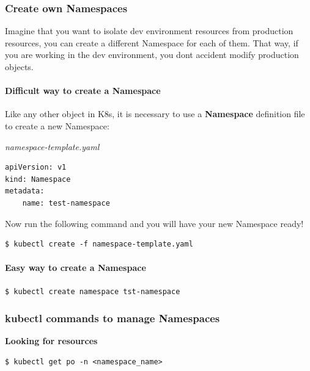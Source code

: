 \documentclass{article}
\newenvironment{codetemplate}[1][]{%
  \mybasecolorbox[#1]
  \itshape
}{%
  \endmybasecolorbox
}
\begin{document}
\subsubsection{Create own Namespaces}

Imagine that you want to isolate dev environment resources from production resources, you can create a different Namespace for each of them. That way, if you are working in the dev environment, you dont accident modify production objects.

\paragraph{Difficult way to create a Namespace}

Like any other object in K8s, it is necessary to use a \textbf{Namespace} definition file to create a new Namespace:

\begin{codetemplate}{namespace-template.yaml}
\begin{verbatim}
apiVersion: v1
kind: Namespace
metadata:
    name: test-namespace
\end{verbatim}
\end{codetemplate}

Now run the following command and you will have your new Namespace ready!

\begin{codetemplate}{}
\begin{verbatim}
$ kubectl create -f namespace-template.yaml
\end{verbatim}
\end{codetemplate}

\paragraph{Easy way to create a Namespace}

\begin{codetemplate}{}
\begin{verbatim}
$ kubectl create namespace tst-namespace
\end{verbatim}
\end{codetemplate}

\subsubsection{kubectl commands to manage Namespaces}

\textbf{Looking for resources}
\begin{codetemplate}{}
\begin{verbatim}
$ kubectl get po -n <namespace_name>
\end{verbatim}
\end{codetemplate}
\end{document}
